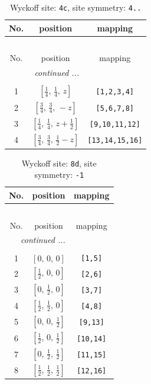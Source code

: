 \documentclass[fleqn,8pt]{jsarticle}
\begin{document}
\renewcommand{\arraystretch}{1.2}
\begin{longtable}{ccc}
\caption{Wyckoff site: {\tt 4c}, site symmetry: {\tt 4..}}
 \\
 \hline \hline
No. & position & mapping \\ \hline \endfirsthead

\multicolumn{2}{l}{\tablename\ \thetable{}} \\
 \hline \hline
No. & position & mapping \\ \hline \endhead

 \hline \hline
\multicolumn{2}{r}{\footnotesize\it continued ...} \\ \endfoot

 \hline \hline
\multicolumn{2}{r}{} \\ \endlastfoot

1 & $\left[ \frac{1}{4},\, \frac{1}{4},\, z \right]$ & {\tt [1,2,3,4]} \\ \hline
2 & $\left[ \frac{3}{4},\, \frac{3}{4},\, - z \right]$ & {\tt [5,6,7,8]} \\ \hline
3 & $\left[ \frac{1}{4},\, \frac{1}{4},\, z + \frac{1}{2} \right]$ & {\tt [9,10,11,12]} \\ \hline
4 & $\left[ \frac{3}{4},\, \frac{3}{4},\, \frac{1}{2} - z \right]$ & {\tt [13,14,15,16]} \\
\end{longtable}
\renewcommand{\arraystretch}{1.2}
\begin{longtable}{ccc}
\caption{Wyckoff site: {\tt 8d}, site symmetry: {\tt -1}}
 \\
 \hline \hline
No. & position & mapping \\ \hline \endfirsthead

\multicolumn{2}{l}{\tablename\ \thetable{}} \\
 \hline \hline
No. & position & mapping \\ \hline \endhead

 \hline \hline
\multicolumn{2}{r}{\footnotesize\it continued ...} \\ \endfoot

 \hline \hline
\multicolumn{2}{r}{} \\ \endlastfoot

1 & $\left[ 0,\, 0,\, 0 \right]$ & {\tt [1,5]} \\ \hline
2 & $\left[ \frac{1}{2},\, 0,\, 0 \right]$ & {\tt [2,6]} \\ \hline
3 & $\left[ 0,\, \frac{1}{2},\, 0 \right]$ & {\tt [3,7]} \\ \hline
4 & $\left[ \frac{1}{2},\, \frac{1}{2},\, 0 \right]$ & {\tt [4,8]} \\ \hline
5 & $\left[ 0,\, 0,\, \frac{1}{2} \right]$ & {\tt [9,13]} \\ \hline
6 & $\left[ \frac{1}{2},\, 0,\, \frac{1}{2} \right]$ & {\tt [10,14]} \\ \hline
7 & $\left[ 0,\, \frac{1}{2},\, \frac{1}{2} \right]$ & {\tt [11,15]} \\ \hline
8 & $\left[ \frac{1}{2},\, \frac{1}{2},\, \frac{1}{2} \right]$ & {\tt [12,16]} \\
\end{longtable}
\end{document}
